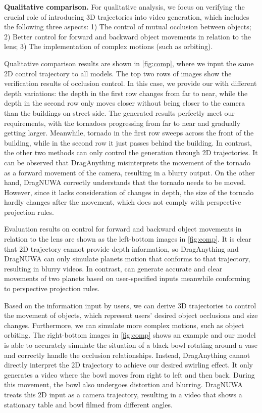 \noindent \textbf{Qualitative comparison.}
For qualitative analysis, we focus on verifying the crucial role of introducing 3D trajectories into video generation, which includes the following three aspects: 1) The control of mutual occlusion between objects; 2) Better control for forward and backward object movements in relation to the lens; 3) The implementation of complex motions (such as orbiting). 

Qualitative comparison results are shown in \cref{fig:comp}, where we input the same 2D control trajectory to all models. The top two rows of images show the verification results of occlusion control. In this case, we provide our \method with different depth variations: the depth in the first row changes from far to near, while the depth in the second row only moves closer without being closer to the camera than the buildings on street side. The generated results perfectly meet our requirements, with the tornadoes progressing from far to near and gradually getting larger. Meanwhile, tornado in the first row sweeps across the front of the building, while in the second row it just passes behind the building. In contrast, the other two methods can only control the generation through 2D trajectories. It can be observed that DragAnything misinterprets the movement of the tornado as a forward movement of the camera, resulting in a blurry output. On the other hand, DragNUWA correctly understands that the tornado needs to be moved. However, since it lacks consideration of changes in depth, the size of the tornado hardly changes after the movement, which does not comply with perspective projection rules.

Evaluation results on control for forward and backward object movements in relation to the lens are shown as the left-bottom images in \cref{fig:comp}. It is clear that 2D trajectory cannot provide depth information, so DragAnything and DragNUWA can only simulate planets motion that conforms to that trajectory, resulting in blurry videos. In contrast, \method can generate accurate and clear movements of two planets based on user-specified inputs meanwhile conforming to perspective projection rules.

Based on the information input by users, we can derive 3D trajectories to control the movement of objects, which represent users' desired object occlusions and size changes. Furthermore, we can simulate more complex motions, such as object orbiting. The right-bottom images in \cref{fig:comp} shows an example and our model is able to accurately simulate the situation of a black bowl rotating around a vase and correctly handle the occlusion relationships. Instead, DragAnything cannot directly interpret the 2D trajectory to achieve our desired swirling effect. It only generates a video where the bowl moves from right to left and then back. During this movement, the bowl also undergoes distortion and blurring. DragNUWA treats this 2D input as a camera trajectory, resulting in a video that shows a stationary table and bowl filmed from different angles.

